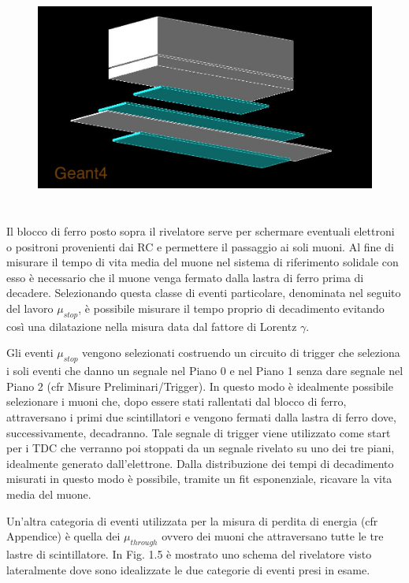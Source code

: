 \documentclass[12pt,a4paper]{report}
\begin{document}
\begin{figure}[t]
	\centering
  \includegraphics[width=12cm, height=7.5cm]{images/general.jpg}
	\caption{}
\end{figure}

\clearpage

Il blocco di ferro posto sopra il rivelatore serve per schermare eventuali elettroni o positroni provenienti dai RC e permettere il passaggio ai soli muoni.
Al fine di misurare il tempo di vita media del muone nel sistema di riferimento solidale con esso è necessario che il muone venga fermato dalla lastra di ferro prima di decadere. Selezionando questa classe di eventi particolare, denominata nel seguito del lavoro $\mu_{stop}$, è possibile misurare il tempo proprio di decadimento evitando così una dilatazione nella misura data dal fattore di Lorentz $\gamma$.

Gli eventi $\mu_{stop}$ vengono selezionati costruendo un circuito di trigger che seleziona i soli eventi che danno un segnale nel Piano 0 e nel Piano 1 senza dare segnale nel Piano 2 (cfr Misure Preliminari/Trigger). In questo modo è idealmente possibile selezionare i muoni che, dopo essere stati rallentati dal blocco di ferro, attraversano i primi due scintillatori e vengono fermati dalla lastra di ferro dove, successivamente, decadranno.
Tale segnale di trigger viene utilizzato come start per i TDC che verranno poi stoppati da un segnale rivelato su uno dei tre piani, idealmente generato dall'elettrone. Dalla distribuzione dei tempi di decadimento misurati in questo modo è possibile, tramite un fit esponenziale, ricavare la vita media del muone.

Un'altra categoria di eventi utilizzata per la misura di perdita di energia (cfr Appendice) è quella dei $\mu_{through}$ ovvero dei muoni che attraversano tutte le tre lastre di scintillatore. In Fig. 1.5 è mostrato uno schema del rivelatore visto lateralmente dove sono idealizzate le due categorie di eventi presi in esame.
\end{document}
